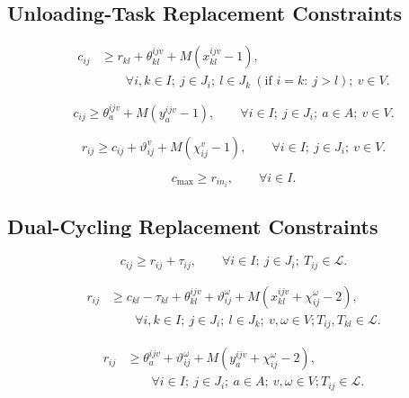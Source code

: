 \documentclass[11pt]{article}
\begin{document}
\subsection{Unloading-Task Replacement Constraints}

\begin{equation}
\begin{aligned}
c_{ij}
&\ge
r_{kl}
+
\theta_{kl}^{ijv}
+
M\left(x_{kl}^{ijv}-1\right),\\
&\qquad
\forall i,k \in I;\ j \in J_i;\ l \in J_k\ ( \text{if } i=k:\ j>l );
\ v \in V.
\end{aligned}
\tag{B16}
\end{equation}

\begin{equation}
c_{ij}
\ge
\theta_a^{ijv}
+
M\left(y_a^{ijv}-1\right),
\qquad
\forall i \in I;\ j \in J_i;\ a \in A;\ v \in V.
\tag{B17}
\end{equation}

\begin{equation}
r_{ij}
\ge
c_{ij}
+
\vartheta_{ij}^{v}
+
M\left(\chi_{ij}^{v}-1\right),
\qquad
\forall i \in I;\ j \in J_i;\ v \in V.
\tag{B18}
\end{equation}

\begin{equation}
c_{\max} \ge r_{in_i},
\qquad \forall i \in I.
\tag{B19}
\end{equation}

\subsection{Dual-Cycling Replacement Constraints}

\begin{equation}
c_{ij} \ge r_{ij}+\tau_{ij},
\qquad \forall i \in I;\ j \in J_i;\ T_{ij}\in\mathcal{L}.
\tag{B20}
\end{equation}

\begin{equation}
\begin{aligned}
r_{ij}
&\ge
c_{kl}-\tau_{kl}
+
\theta_{kl}^{ijv}
+
\vartheta_{ij}^{\omega}
+
M\left(x_{kl}^{ijv}+\chi_{ij}^{\omega}-2\right),\\
&\qquad
\forall i,k \in I;\ j \in J_i;\ l \in J_k;\ v,\omega \in V;
T_{ij},T_{kl}\in\mathcal{L}.
\end{aligned}
\tag{B21}
\end{equation}

\begin{equation}
\begin{aligned}
r_{ij}
&\ge
\theta_a^{ijv}
+
\vartheta_{ij}^{\omega}
+
M\left(y_a^{ijv}+\chi_{ij}^{\omega}-2\right),\\
&\qquad
\forall i \in I;\ j \in J_i;\ a \in A;\ v,\omega \in V;
T_{ij}\in\mathcal{L}.
\end{aligned}
\tag{B22}
\end{equation}
\end{document}
